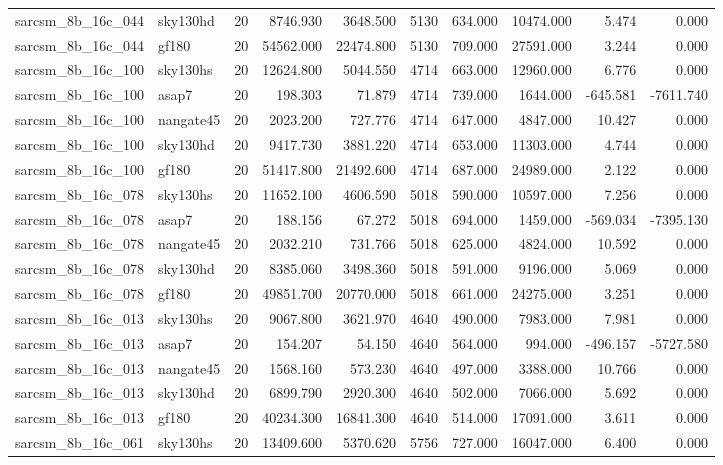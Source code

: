 \documentclass{article}
\begin{document}
\begin{longtable}{llrrrrrrrr}
sarcsm\_8b\_16c\_044 & sky130hd & 20 & 8746.930 & 3648.500 & 5130 & 634.000 & 10474.000 & 5.474 & 0.000 \\
sarcsm\_8b\_16c\_044 & gf180 & 20 & 54562.000 & 22474.800 & 5130 & 709.000 & 27591.000 & 3.244 & 0.000 \\
sarcsm\_8b\_16c\_100 & sky130hs & 20 & 12624.800 & 5044.550 & 4714 & 663.000 & 12960.000 & 6.776 & 0.000 \\
sarcsm\_8b\_16c\_100 & asap7 & 20 & 198.303 & 71.879 & 4714 & 739.000 & 1644.000 & -645.581 & -7611.740 \\
sarcsm\_8b\_16c\_100 & nangate45 & 20 & 2023.200 & 727.776 & 4714 & 647.000 & 4847.000 & 10.427 & 0.000 \\
sarcsm\_8b\_16c\_100 & sky130hd & 20 & 9417.730 & 3881.220 & 4714 & 653.000 & 11303.000 & 4.744 & 0.000 \\
sarcsm\_8b\_16c\_100 & gf180 & 20 & 51417.800 & 21492.600 & 4714 & 687.000 & 24989.000 & 2.122 & 0.000 \\
sarcsm\_8b\_16c\_078 & sky130hs & 20 & 11652.100 & 4606.590 & 5018 & 590.000 & 10597.000 & 7.256 & 0.000 \\
sarcsm\_8b\_16c\_078 & asap7 & 20 & 188.156 & 67.272 & 5018 & 694.000 & 1459.000 & -569.034 & -7395.130 \\
sarcsm\_8b\_16c\_078 & nangate45 & 20 & 2032.210 & 731.766 & 5018 & 625.000 & 4824.000 & 10.592 & 0.000 \\
sarcsm\_8b\_16c\_078 & sky130hd & 20 & 8385.060 & 3498.360 & 5018 & 591.000 & 9196.000 & 5.069 & 0.000 \\
sarcsm\_8b\_16c\_078 & gf180 & 20 & 49851.700 & 20770.000 & 5018 & 661.000 & 24275.000 & 3.251 & 0.000 \\
sarcsm\_8b\_16c\_013 & sky130hs & 20 & 9067.800 & 3621.970 & 4640 & 490.000 & 7983.000 & 7.981 & 0.000 \\
sarcsm\_8b\_16c\_013 & asap7 & 20 & 154.207 & 54.150 & 4640 & 564.000 & 994.000 & -496.157 & -5727.580 \\
sarcsm\_8b\_16c\_013 & nangate45 & 20 & 1568.160 & 573.230 & 4640 & 497.000 & 3388.000 & 10.766 & 0.000 \\
sarcsm\_8b\_16c\_013 & sky130hd & 20 & 6899.790 & 2920.300 & 4640 & 502.000 & 7066.000 & 5.692 & 0.000 \\
sarcsm\_8b\_16c\_013 & gf180 & 20 & 40234.300 & 16841.300 & 4640 & 514.000 & 17091.000 & 3.611 & 0.000 \\
sarcsm\_8b\_16c\_061 & sky130hs & 20 & 13409.600 & 5370.620 & 5756 & 727.000 & 16047.000 & 6.400 & 0.000 \\

\end{longtable}
\end{document}
